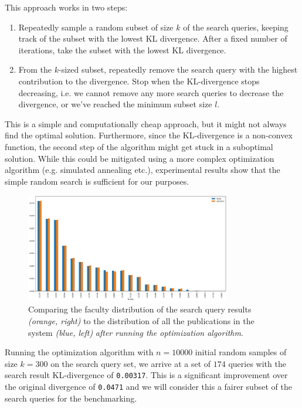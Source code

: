 This approach works in two steps:

\begin{enumerate}
    \item Repeatedly sample a random subset of size $k$ of the search queries, keeping track of the subset with the lowest KL divergence.
After a fixed number of iterations, take the subset with the lowest KL divergence.
    \item From the $k$-sized subset, repeatedly remove the search query with the highest contribution to the divergence.
Stop when the KL-divergence stops decreasing, i.e. we cannot remove any more search queries to decrease the divergence, or we've reached the minimum subset size $l$.
\end{enumerate}

This is a simple and computationally cheap approach, but it might not always find the optimal solution.
Furthermore, since the KL-divergence is a non-convex function, the second step of the algorithm might get stuck in a suboptimal solution.
While this could be mitigated using a more complex optimization algorithm (e.g. simulated annealing etc.), experimental results show that the simple random search is sufficient for our purposes.

\begin{figure}[ht!]
    \captionsetup{width=.9\linewidth}
    \includegraphics[width=0.8\textwidth]{../img/all-queries-vs-totals-corrected.png}
    \centering
    \caption{Comparing the faculty distribution of the search query results \textit{(orange, right)} to the distribution of all the publications in the system \textit{(blue, left)} \textit{after running the optimization algorithm}.}
\end{figure}

Running the optimization algorithm with $n = 10000$ initial random samples of size $k = 300$ on the search query set, we arrive at a set of $174$ queries with the search result KL-divergence of \texttt{0.00317}. 
This is a significant improvement over the original divergence of \texttt{0.0471} and we will consider this a fairer subset of the search queries for the benchmarking.

